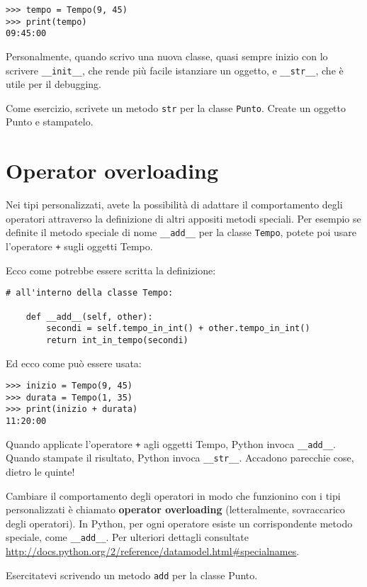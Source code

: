 \documentclass[10pt]{book}
\begin{document}
\begin{verbatim}
>>> tempo = Tempo(9, 45)
>>> print(tempo)
09:45:00
\end{verbatim}
%
Personalmente, quando scrivo una nuova classe, quasi sempre inizio con lo scrivere \verb"__init__", che rende più facile istanziare un oggetto, e 
\verb"__str__", che è utile per il debugging.

Come esercizio, scrivete un metodo {\tt str} per la classe {\tt Punto}.  Create un oggetto Punto e stampatelo.


\section{Operator overloading}
\label{operator.overloading}

Nei tipi personalizzati, avete la possibilità di adattare il comportamento degli operatori attraverso la definizione di altri appositi metodi speciali. Per esempio se definite il metodo speciale di nome \verb"__add__" per la classe {\tt Tempo}, potete poi usare l'operatore {\tt +} sugli oggetti Tempo.

Ecco come potrebbe essere scritta la definizione:

\begin{verbatim}
# all'interno della classe Tempo:

    def __add__(self, other):
        secondi = self.tempo_in_int() + other.tempo_in_int()
        return int_in_tempo(secondi)
\end{verbatim}
%
Ed ecco come può essere usata:

\begin{verbatim}
>>> inizio = Tempo(9, 45)
>>> durata = Tempo(1, 35)
>>> print(inizio + durata)
11:20:00
\end{verbatim}
%
Quando applicate l'operatore {\tt +} agli oggetti Tempo, Python invoca
\verb"__add__".  Quando stampate il risultato, Python invoca 
\verb"__str__".  Accadono parecchie cose, dietro le quinte!

Cambiare il comportamento degli operatori in modo che funzionino con i tipi personalizzati è chiamato {\bf operator overloading} (letteralmente, sovraccarico degli operatori). In Python, per ogni operatore esiste un corrispondente metodo speciale, come
\verb"__add__".  Per ulteriori dettagli consultate
\url{http://docs.python.org/2/reference/datamodel.html#specialnames}.

Esercitatevi scrivendo un metodo {\tt add} per la classe Punto.  
\end{document}
